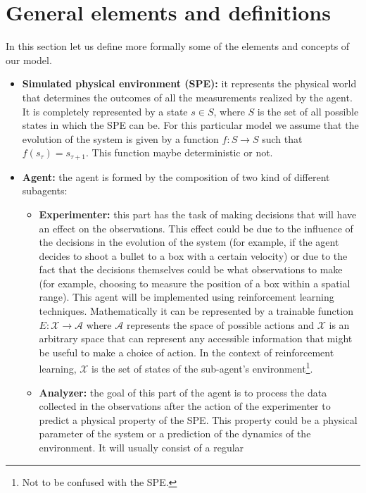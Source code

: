 \documentclass[11pt,a4paper,twoside]{report}
\newcommand{\+}{\textnormal{+} }
\theoremstyle{definition}
\numberwithin{equation}{chapter}
\begin{document}
\section{General elements and definitions}
In this section let us define more formally some of the elements and concepts of
our model.
\begin{itemize}
    \item \textbf{Simulated physical environment (SPE): } it represents the
    physical world that determines the outcomes of all the measurements realized
    by the agent. It is completely represented by a state $ s \in S $, where $S$
    is the set of all possible states in which the SPE can be. For this
    particular model we assume that the evolution of the system is given by a
    function $f: S \rightarrow S$ such that $f(s_\tau)=s_{\tau+1}$. This
    function maybe deterministic or not.
    \item \textbf{Agent:} the agent is formed by the composition of two kind of
    different subagents:
    \begin{itemize}
        \item \textbf{Experimenter:} this part has the task of making decisions
        that will have an effect on the observations. This effect could be due
        to the influence of the decisions in the evolution of the system (for
        example, if the agent decides to shoot a bullet to a box with a certain
        velocity) or due to the fact that the decisions themselves could be what
        observations to make (for example, choosing to measure the position of a
        box within a spatial range). This agent will be implemented using
        reinforcement learning techniques. Mathematically it can be represented
        by a trainable function $E:\mathcal{X}\rightarrow\mathcal{A}$ where
        $\mathcal{A}$ represents the space of possible actions and $\mathcal{X}$
        is an arbitrary space that can represent any accessible information that
        might be useful to make a choice of action. In the context of
        reinforcement learning, $\mathcal{X}$ is the set of states of the
        sub-agent's environment\footnote{Not to be confused with the SPE.}.
        \item \textbf{Analyzer:} the goal of this part of the agent is to
        process the data collected in the observations after the action of the
        experimenter to predict a physical property of the SPE. This property
        could be a physical parameter of the system or a prediction of the
        dynamics of the environment. It will usually consist of a regular

\end{itemize}
\end{itemize}
\end{document}
